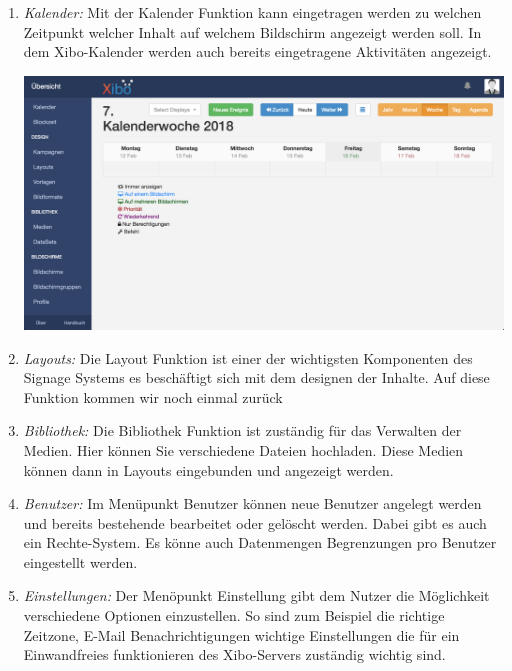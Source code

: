 \begin{enumerate}
	\item {\em Kalender:} Mit der Kalender Funktion kann eingetragen werden zu welchen Zeitpunkt welcher Inhalt auf welchem Bildschirm angezeigt werden soll. In dem Xibo-Kalender werden auch bereits eingetragene Aktivitäten angezeigt.

\begin{calendar}
	\centering
\includegraphics[width=1\textwidth]{images/xibo-basics-calendar}
	\label{Calendar}
\end{calendar}	
	
	\item {\em Layouts:} 
	Die Layout Funktion ist einer der wichtigsten Komponenten des Signage Systems es beschäftigt sich mit dem designen der Inhalte. Auf diese Funktion kommen wir noch einmal zurück
	
	\item {\em Bibliothek:} 
	Die Bibliothek Funktion ist zuständig für das Verwalten der Medien. Hier können Sie verschiedene Dateien hochladen.  Diese Medien können dann in Layouts eingebunden und angezeigt werden.
	
	\item {\em Benutzer:} 
	Im Menüpunkt Benutzer können neue Benutzer angelegt werden und bereits bestehende bearbeitet oder gelöscht werden. Dabei gibt es auch ein Rechte-System. Es könne auch Datenmengen Begrenzungen pro Benutzer eingestellt werden.
	
	\item {\em Einstellungen:} 
	Der Menöpunkt Einstellung gibt dem Nutzer die Möglichkeit verschiedene Optionen einzustellen. So sind zum Beispiel die richtige Zeitzone, E-Mail Benachrichtigungen wichtige Einstellungen die für ein Einwandfreies funktionieren des Xibo-Servers zuständig wichtig sind.
\end{enumerate}

